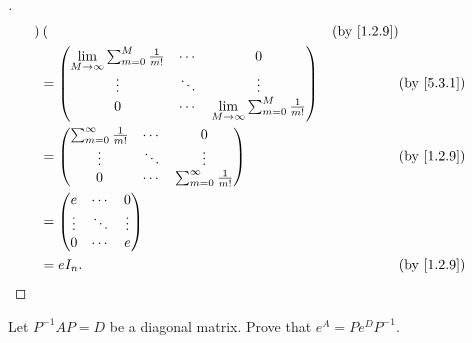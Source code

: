 \begin{proof}[]
\begin{align*}
\begin{pmatrix}
                                    \end{pmatrix}                                        &  & \by{1.2.9}                                     \\
            & = \begin{pmatrix}
                  \Lim_{M \to \infty} \sum_{m = 0}^M  \frac{1}{m!} & \cdots & 0                                              \\
                  \vdots                                           & \ddots & \vdots                                         \\
                  0                                                & \cdots & \Lim_{M \to \infty}\sum_{m = 0}^M \frac{1}{m!}
                \end{pmatrix} &  & \by{5.3.1}                   \\
            & = \begin{pmatrix}
                  \sum_{m = 0}^\infty \frac{1}{m!} & \cdots & 0                                \\
                  \vdots                           & \ddots & \vdots                           \\
                  0                                & \cdots & \sum_{m = 0}^\infty \frac{1}{m!}
                \end{pmatrix}                               &  & \by{1.2.9}                                                 \\
            & = \begin{pmatrix}
                  e      & \cdots & 0      \\
                  \vdots & \ddots & \vdots \\
                  0      & \cdots & e
                \end{pmatrix}                                                                                                     \\
            & = e I_n.                                                                                                      &  & \by{1.2.9}
  \end{align*}
\end{proof}

\begin{ex}\label{ex:5.3.21}
  Let \(P^{-1} A P = D\) be a diagonal matrix.
  Prove that \(e^A = P e^D P^{-1}\).
\end{ex}

